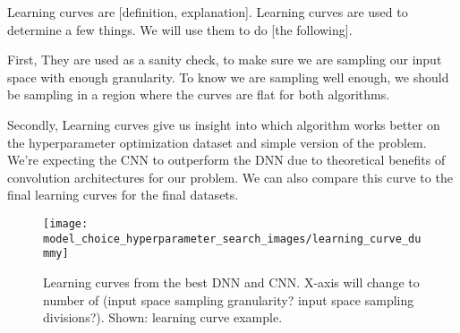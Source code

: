 Learning curves are [definition, explanation]. Learning curves are used to determine a few things. We will use them to do [the following].

First, They are used as a sanity check, to make sure we are sampling our input space with enough granularity. To know we are sampling well enough, we should be sampling in a region where the curves are flat for both algorithms.

Secondly, Learning curves give us insight into which algorithm works better on the hyperparameter optimization dataset and simple version of the problem. We're expecting the CNN to outperform the DNN due to theoretical benefits of convolution architectures for our problem. We can also compare this curve to the final learning curves for the final datasets.



\begin{figure}[H]
	\centering
	\texttt{[image: model\_choice\_hyperparameter\_search\_images/learning\_curve\_dummy]}
	\caption{Learning curves from the best DNN and CNN. X-axis will change to number of (input space sampling granularity? input space sampling divisions?). Shown: learning curve example.}
	\label{fig:Node}
\end{figure}








